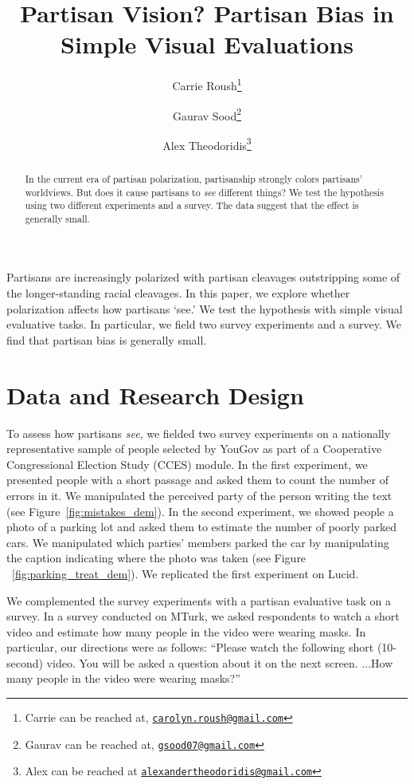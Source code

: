 \documentclass[12pt, letterpaper]{article}
\title{Partisan Vision? Partisan Bias in Simple Visual Evaluations}
\author{Carrie Roush\thanks{Carrie can be reached at, \href{mailto:carolyn.roush@gmail.com}{\texttt{carolyn.roush@gmail.com}}} \and 
Gaurav Sood\thanks{Gaurav can be reached at, \href{mailto:gsood07@gmail.com}{\texttt{gsood07@gmail.com}}} \and 
Alex Theodoridis\thanks{Alex can be reached at \href{alexandertheodoridis@gmail.com}{\texttt{alexandertheodoridis@gmail.com}}}}
\begin{document}
\maketitle
\thispagestyle{empty}

\begin{abstract}

\noindent In the current era of partisan polarization, partisanship strongly colors partisans' worldviews. But does it cause partisans to \textit{see} different things? We test the hypothesis using two different experiments and a survey. The data suggest that the effect is generally small.
\end{abstract}

\newpage

\doublespacing

Partisans are increasingly polarized \cite{IyengarSoodLelkes2012} with partisan cleavages outstripping some of the longer-standing racial cleavages. In this paper, we explore whether polarization affects how partisans `see.' We test the hypothesis with simple visual evaluative tasks. In particular, we field two survey experiments and a survey. We find that partisan bias is generally small.

\section{Data and Research Design}
To assess how partisans \textit{see}, we fielded two survey experiments on a nationally representative sample of people selected by YouGov \citep{rivers2007} as part of a Cooperative Congressional Election Study (CCES) module. In the first experiment, we presented people with a short passage and asked them to count the number of errors in it. We manipulated the perceived party of the person writing the text (see Figure~\ref{fig:mistakes_dem}). In the second experiment, we showed people a photo of a parking lot and asked them to estimate the number of poorly parked cars. We manipulated which parties' members parked the car by manipulating the caption indicating where the photo was taken (see Figure ~\ref{fig:parking_treat_dem}). We replicated the first experiment on Lucid.

We complemented the survey experiments with a partisan evaluative task on a survey. In a survey conducted on MTurk, we asked respondents to watch a short video and estimate how many people in the video were wearing masks. In particular, our directions were as follows: ``Please watch the following short (10-second) video. You will be asked a question about it on the next screen. ...How many people in the video were wearing masks?''
\end{document}
